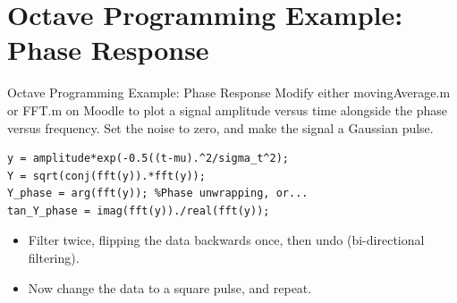 \documentclass{beamer}
\begin{document}
\section{Octave Programming Example: Phase Response}

\begin{frame}[fragile]{Octave Programming Example: Phase Response}
Modify either movingAverage.m or FFT.m on Moodle to plot a signal amplitude versus time alongside the phase versus frequency.  Set the noise to zero, and make the signal a Gaussian pulse.
\begin{verbatim}
y = amplitude*exp(-0.5((t-mu).^2/sigma_t^2);
Y = sqrt(conj(fft(y)).*fft(y));
Y_phase = arg(fft(y)); %Phase unwrapping, or...
tan_Y_phase = imag(fft(y))./real(fft(y));
\end{verbatim}
\begin{itemize}
\item Filter twice, flipping the data backwards once, then undo (bi-directional filtering).
\item Now change the data to a square pulse, and repeat.
\end{itemize}
\end{frame}
\end{document}
